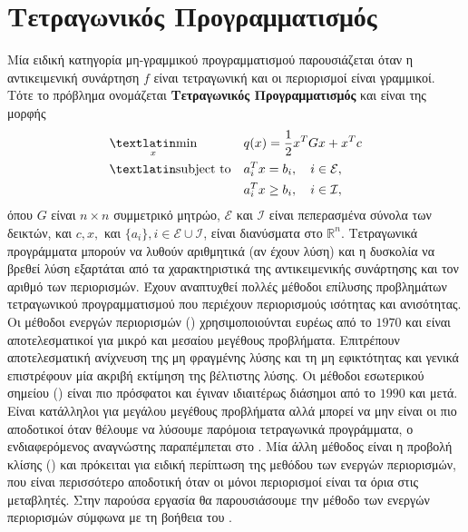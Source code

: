 \chapter{Τετραγωνικός Προγραμματισμός}\label{ch:qp}
Μία ειδική κατηγορία μη-γραμμικού προγραμματισμού παρουσιάζεται όταν η
αντικειμενική συνάρτηση $f$ είναι τετραγωνική και οι περιορισμοί είναι
γραμμικοί. Τότε το πρόβλημα ονομάζεται \textbf{Τετραγωνικός Προγραμματισμός} και
είναι της μορφής
\begin{equation}\label{eq:qp_min}
    \begin{aligned}
        & \underset{x}{\text{\tl{min}}}
        & & q(x) = \frac{1}{2}x^TGx + x^Tc \\
        & \text{\tl{subject to}}
        & & a^T_ix = b_i, \quad i \in \mathcal{E}, \\
        &&& a_i^Tx \ge b_i, \quad i \in \mathcal{I},
    \end{aligned}
\end{equation}
όπου $G$ είναι $n \times n$ συμμετρικό μητρώο, $\mathcal{E}$ και $\mathcal{I}$
είναι πεπερασμένα σύνολα των δεικτών, και $c, x,$ και $\{a_i\}, i \in
\mathcal{E}\cup \mathcal{I}$, είναι διανύσματα στο $\mathbb{R}^n$. Τετραγωνικά
προγράμματα μπορούν να λυθούν αριθμητικά (αν έχουν λύση) και η δυσκολία να
βρεθεί λύση εξαρτάται από τα χαρακτηριστικά της αντικειμενικής συνάρτησης και
τον αριθμό των περιορισμών. Έχουν αναπτυχθεί πολλές μέθοδοι επίλυσης προβλημάτων
τετραγωνικού προγραμματισμού που περιέχουν περιορισμούς ισότητας και ανισότητας.
Οι μέθοδοι ενεργών περιορισμών () χρησιμοποιούνται ευρέως από το
$1970$ και είναι αποτελεσματικοί για μικρό και μεσαίου μεγέθους προβλήματα.
Επιτρέπουν αποτελεσματική ανίχνευση της μη φραγμένης λύσης και τη μη εφικτότητας
και γενικά επιστρέφουν μία ακριβή εκτίμηση της βέλτιστης λύσης. Οι μέθοδοι
εσωτερικού σημείου () είναι πιο πρόσφατοι και έγιναν
ιδιαιτέρως διάσημοι από το $1990$ και μετά. Είναι κατάλληλοι για μεγάλου
μεγέθους προβλήματα αλλά μπορεί να μην είναι οι πιο αποδοτικοί όταν θέλουμε να
λύσουμε παρόμοια τετραγωνικά προγράμματα, ο ενδιαφερόμενος αναγνώστης παραπέμπεται στο
\cite{boyd2004convex}. Μία άλλη μέθοδος είναι η προβολή
κλίσης () και πρόκειται για ειδική περίπτωση της
μεθόδου των ενεργών περιορισμών, που είναι περισσότερο αποδοτική όταν οι μόνοι
περιορισμοί είναι τα όρια στις μεταβλητές. Στην παρούσα εργασία θα παρουσιάσουμε την
μέθοδο των ενεργών περιορισμών σύμφωνα με τη βοήθεια του
\cite{nocedal2006numerical}.

